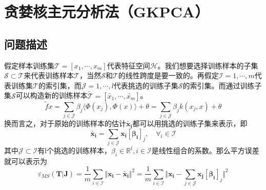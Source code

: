 \documentclass[12pt,a4paper,CJK]{beamer}
\begin{document}
\begin{CJK*}{UTF8}{gkai}
\begin{frame}{\subsecname}
\end{frame}


\section{贪婪核主元分析法（GKPCA）}
\subsection{问题描述}
\begin{frame}{\subsecname}
假定样本训练集$\mathcal{T}=[x_1,\cdots,x_m]$代表特征空间$\mathcal{H}$。我们想要选择训练样本的子集$\mathcal{S} \subset \mathcal{T}$来代表训练样本$\mathcal{T}$，当然$\mathcal{S}$和$\mathcal{T}$的线性跨度是要一致的。再假定$\mathcal{I}={1,\cdots,m}$代表训练集$\mathcal{T}$的索引集，而$\mathcal{J}={1,\cdots,l}$代表挑选的训练子集$\mathcal{S}$的索引集。而通过训练子集$\mathcal{S}$可以构造新的训练样本$\tilde{\mathcal{T}}=[\tilde{x_1},\cdots,\tilde{x_m}]$。
\begin{equation}
\tilde{f}{x}=\sum_{j \in \mathcal{J}} \beta_j\langle \Phi(x_j),\Phi(x) \rangle+\theta
=\sum_{j \in \mathcal{J}} \beta_j k(x_j,x) +\theta
\end{equation}
换而言之，对于原始的训练样本的估计$\tilde{\boldsymbol{x_i}}$都可以用挑选的训练子集来表示，即
\begin{equation}
\tilde{\boldsymbol{x_i}}=\sum_{j \in \mathcal{J}} \boldsymbol{x_i}[\mathbf{\beta_i}]_j, \quad \forall_i \in \mathcal{I}
\end{equation}
其中$\mathcal{J} \subset \mathcal{I}$有l个挑选的训练样本，$\beta_i \in \mathbb{R}^l,i \in \mathcal{I}$是线性组合的系数。那么平方误差就可以表示为
\begin{equation}
\label{gpcame}
\varepsilon_{MS}(\boldsymbol{T}|\boldsymbol{J})=
\frac{1}{m}\sum_{i \in \mathcal{I}}\Vert \boldsymbol{x_i}-\tilde{\boldsymbol{x_i}} \Vert^2
=\frac{1}{m}\sum_{i \in \mathcal{I}}\Vert \boldsymbol{x_i}-\sum_{j \in \mathcal{J}} \boldsymbol{x_j}[\mathbf{\beta_i}]_j \Vert^2
\end{equation}

\end{frame}



\end{CJK*}
\end{document}
